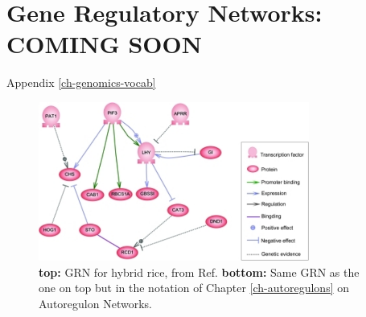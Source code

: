 \chapter{Gene Regulatory Networks: COMING SOON}
\label{ch_gene_reg_net}

Appendix \ref{ch-genomics-vocab}


\begin{figure}[h!]
\centering
\includegraphics[width=3.5in]
{gene-reg-net/DG_Network_in_Hybrid_Rice.png}
\caption{{\bf top:} GRN for hybrid rice, from Ref.\cite{wiki-gene-reg-net}
{\bf bottom:} Same GRN 
as the one on top but in the notation of Chapter \ref{ch-autoregulons}
on Autoregulon Networks.}
\label{fig-rice-gene-reg-net}
\end{figure}

